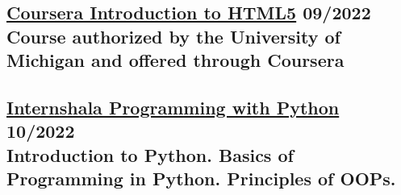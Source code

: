 \subsection{\href{https://www.coursera.org/account/accomplishments/verify/F4CYXQ87QGPE?utm_source=link&utm_medium=certificate&utm_content=cert_image&utm_campaign=sharing_cta&utm_product=course}{Coursera Introduction to HTML5} \hfill \textbf{09/2022} \\
Course authorized by the University of Michigan and offered through Coursera}

\subsection{\href{https://trainings.internshala.com/view_certificate/0964F207-EFA3-0474-D33D-ED948619537A/91B30E22-9A37-61E1-C8B2-69ACC7798F0F/}{Internshala Programming with Python}  \hfill \textbf{10/2022} \\
Introduction to Python. Basics of Programming in Python. Principles of OOPs.}